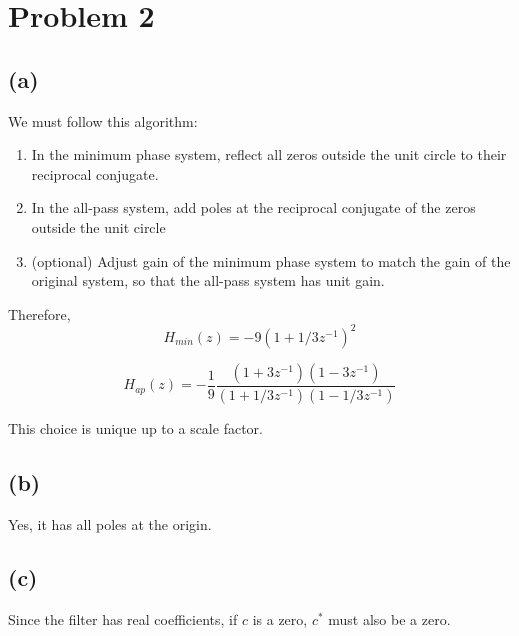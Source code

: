 \documentclass{article}
\begin{document}
\UndefineShortVerb{\$} 
\UndefineShortVerb{\#}





\newpage

\section{Problem 2}
\subsection{(a)}

\begin{figure}[!h]
	\resizebox{0.9\textwidth}{!}{}
\end{figure}

We must follow this algorithm:
\begin{enumerate}
	\item In the minimum phase system, reflect all zeros outside the unit circle to their reciprocal conjugate.
	\item In the all-pass system, add poles at the reciprocal conjugate of the zeros outside the unit circle
	\item (optional) Adjust gain of the minimum phase system to match the gain of the original system, so that the all-pass system has unit gain.
\end{enumerate}

Therefore,
\begin{equation}
H_{min}(z) = -9(1 + 1/3z^{-1})^2
\end{equation}

\begin{equation}
H_{ap}(z) = -\frac{1}{9}\frac{(1 + 3z^{-1})(1 - 3z^{-1})}{(1 + 1/3z^{-1})(1 - 1/3z^{-1})}
\end{equation}
	
This choice is unique up to a scale factor.
	
\subsection{(b)}
Yes, it has all poles at the origin.

\subsection{(c)}

Since the filter has real coefficients, if $c$ is a zero, $c^*$ must also be a zero.
\end{document}
